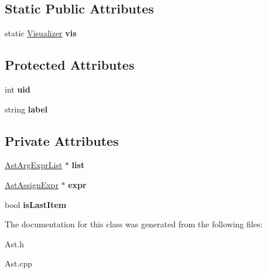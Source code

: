 \subsection*{Static Public Attributes}
\begin{DoxyCompactItemize}
\item 
\hypertarget{classAST_aca9e6637209b31e03a09c0d42f29bdfa}{static \hyperlink{classVisualizer}{Visualizer} {\bfseries vis}}\label{classAST_aca9e6637209b31e03a09c0d42f29bdfa}

\end{DoxyCompactItemize}
\subsection*{Protected Attributes}
\begin{DoxyCompactItemize}
\item 
\hypertarget{classAST_a847b778f1c3dd5a19de32de432ee6e15}{int {\bfseries uid}}\label{classAST_a847b778f1c3dd5a19de32de432ee6e15}

\item 
\hypertarget{classAST_ab2e239ccc0688d2341724432ff5a1a31}{string {\bfseries label}}\label{classAST_ab2e239ccc0688d2341724432ff5a1a31}

\end{DoxyCompactItemize}
\subsection*{Private Attributes}
\begin{DoxyCompactItemize}
\item 
\hypertarget{classAstArgExprList_a4a0fd4e00397023f7e4b4314423d4480}{\hyperlink{classAstArgExprList}{Ast\-Arg\-Expr\-List} $\ast$ {\bfseries list}}\label{classAstArgExprList_a4a0fd4e00397023f7e4b4314423d4480}

\item 
\hypertarget{classAstArgExprList_aad0631c6ff771c0feb1d06e2740afe6e}{\hyperlink{classAstAssignExpr}{Ast\-Assign\-Expr} $\ast$ {\bfseries expr}}\label{classAstArgExprList_aad0631c6ff771c0feb1d06e2740afe6e}

\item 
\hypertarget{classAstArgExprList_a38260d038461e9bad44d41cc7f663c52}{bool {\bfseries is\-Last\-Item}}\label{classAstArgExprList_a38260d038461e9bad44d41cc7f663c52}

\end{DoxyCompactItemize}


The documentation for this class was generated from the following files\-:\begin{DoxyCompactItemize}
\item 
Ast.\-h\item 
Ast.\-cpp\end{DoxyCompactItemize}
